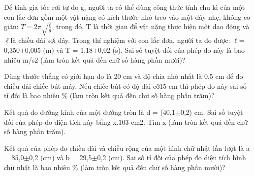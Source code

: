 \begin{ex}
Để tính gia tốc rơi tự do g, người ta có thể dùng công thức tính chu kì của một
con lắc đơn gồm một vật nặng có kích thước nhỏ treo vào một dây nhẹ, không co giãn:
$T = 2\pi \sqrt{\frac{\ell}{g}}$, trong đó, T là thời gian để vật nặng thực hiện một dao động và $\ell$là chiều
dài sợi dây. Trong thí nghiệm với con lắc đơn, người ta đo được: $\ell$= 0,350$\pm$0,005 (m) và
T = 1,18$\pm$0,02 (s). Sai số tuyệt đối của phép đo này là bao nhiêu m/s2 (làm tròn kết quả
đến chữ số hàng phần mười)?

\end{ex}

\begin{ex}
Dùng thước thẳng có giới hạn đo là 20 cm và độ chia nhỏ nhất là 0,5 cm để đo
chiều dài chiếc bút máy. Nếu chiếc bút có độ dài cỡ15 cm thì phép đo này sai số tỉ đối là
bao nhiêu \% (làm tròn kết quả đến chữ số hàng phần trăm)?

\end{ex}

\begin{ex}
Kết quả đo đường kính của một đường tròn là d = (40,1$\pm$0,2) cm. Sai số tuyệt
đối của phép đo diện tích này bằng x.103 cm2. Tìm x (làm tròn kết quả đến chữ số hàng
phần trăm).

\end{ex}

\begin{ex}
Kết quả của phép đo chiều dài và chiều rộng của một hình chữ nhật lần lượt là
a = 85,0$\pm$0,2 (cm) và b = 29,5$\pm$0,2 (cm). Sai số tỉ đối của phép đo diện tích hình chữ nhật
là bao nhiêu \% (làm tròn kết quả đến chữ số hàng phần mười)?

\end{ex}

